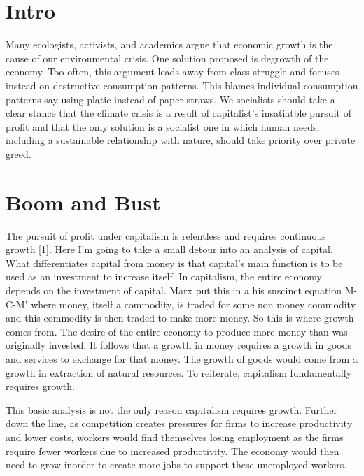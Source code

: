\documentclass{article}
\title{}
\author{Long Nguyen}
\date{August 2023}
\begin{document}
\maketitle

\section{Intro}
Many ecologists, activists, and academics argue that economic growth is the cause of our environmental crisis. One solution proposed is degrowth of the economy. Too often, this argument leads away from class struggle and focuses instead on destructive consumption patterns. This blames individual consumption patterns say using platic instead of paper straws. We socialists should take a clear stance that the climate crisis is a result of capitalist's insatiatble pursuit of profit and that the only solution is a socialist one in which human needs, including a sustainable relationship with nature, should take priority over private greed.

\section{Boom and Bust}
The pursuit of profit under capitalism is relentless and requires continuous growth [1]. Here I'm going to take a small detour into an analysis of capital. What differentiates capital from money is that capital's main function is to be used as an investment to increase itself. In capitalism, the entire economy depends on the investment of capital. Marx put this in a his suscinct equation M-C-M' where money, itself a commodity, is traded for some non money commodity and this commodity is then traded to make more money. So this is where growth comes from. The desire of the entire economy to produce more money than was originally invested. It follows that a growth in money requires a growth in goods and services to exchange for that money. The growth of goods would come from a growth in extraction of natural resources. To reiterate, capitalism fundamentally requires growth.

This basic analysis is not the only reason capitalism requires growth. Further down the line, as competition creates pressures for firms to increase productivity and lower costs, workers would find themselves losing employment as the firms require fewer workers due to increased productivity. The economy would then need to grow inorder to create more jobs to support these unemployed workers.
\end{document}
